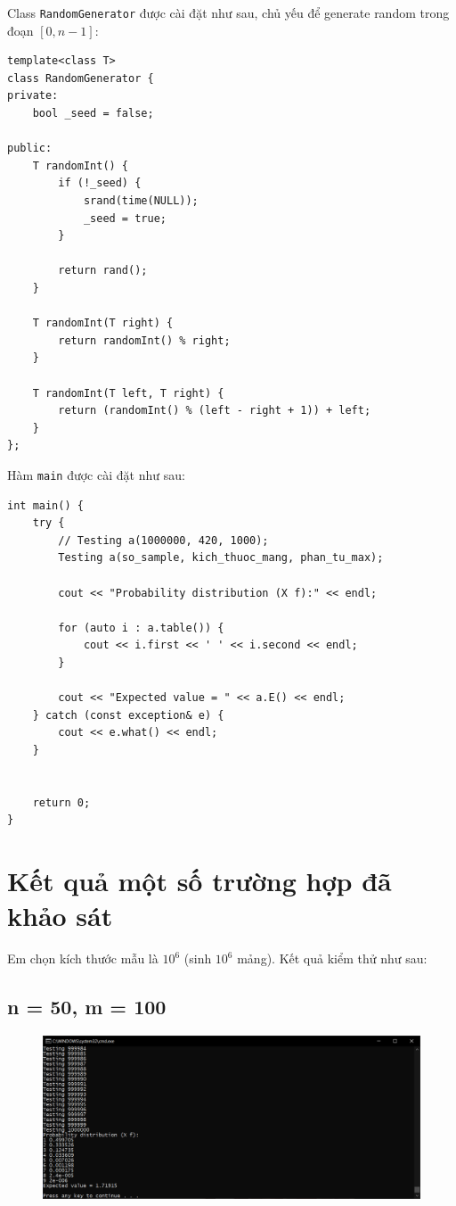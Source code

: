 \documentclass[12pt]{article}
\begin{document}
Class \texttt{RandomGenerator} được cài đặt như sau, chủ yếu để generate random trong đoạn $[0, n -1 ]$:
\begin{lstlisting}
template<class T>
class RandomGenerator {
private:
    bool _seed = false;

public:
    T randomInt() {
        if (!_seed) {
            srand(time(NULL));
            _seed = true;
        }

        return rand();
    }

    T randomInt(T right) {
        return randomInt() % right;
    }

    T randomInt(T left, T right) {
        return (randomInt() % (left - right + 1)) + left;
    }
};
\end{lstlisting}
Hàm \texttt{main} được cài đặt như sau:
\begin{lstlisting}
int main() {
    try {
        // Testing a(1000000, 420, 1000);
        Testing a(so_sample, kich_thuoc_mang, phan_tu_max);
            
        cout << "Probability distribution (X f):" << endl; 

        for (auto i : a.table()) {
            cout << i.first << ' ' << i.second << endl;
        }

        cout << "Expected value = " << a.E() << endl;
    } catch (const exception& e) {
        cout << e.what() << endl;
    }
    

    return 0;
}
\end{lstlisting}
\section{Kết quả một số trường hợp đã khảo sát}
Em chọn kích thước mẫu là $10^6$ (sinh $10^6$ mảng). Kết quả kiểm thử như sau:
\subsection{n = 50, m = 100}
\begin{figure}[H]
\centering
\includegraphics[scale=0.5]{50-100-1000k.PNG}
\end{figure}
\end{document}
